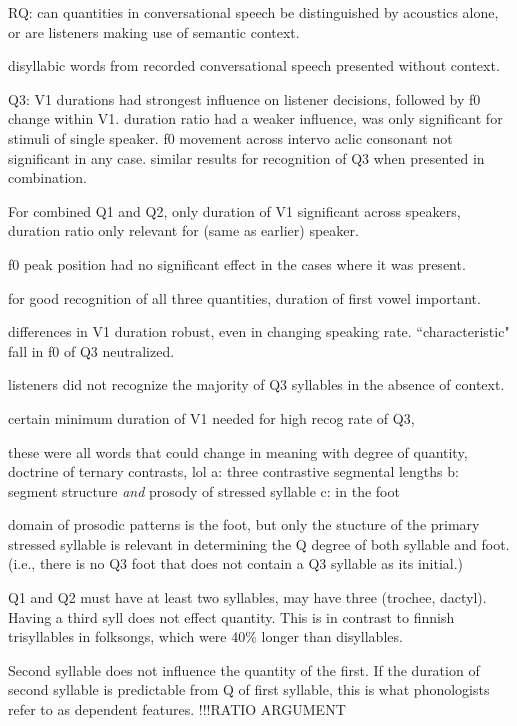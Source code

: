 RQ: can quantities in conversational speech be distinguished by acoustics alone, or are listeners making use of semantic context. 

disyllabic words from recorded conversational speech presented without context. 

Q3: V1 durations had strongest influence on listener decisions, followed by f0 change within V1. duration ratio had a weaker influence, was only significant for stimuli of single speaker. f0 movement across intervo aclic consonant not significant in any case. similar results for recognition of Q3 when presented in combination.

For combined Q1 and Q2, only duration of V1 significant across speakers, duration ratio only relevant for (same as earlier) speaker. 

f0 peak position had no significant effect in the cases where it was present. 

for good recognition of all three quantities, duration of first vowel important. 

differences in V1 duration robust, even in changing speaking rate. ``characteristic" fall in f0 of Q3 neutralized. 

 listeners did not recognize the majority of Q3 syllables in the absence of context. 
 
 certain minimum duration of V1 needed for high recog rate of Q3, 
 
 these were all words that could change in meaning with degree of quantity,
\cite{krullUralica98} 
doctrine of ternary contrasts, lol 
a: three contrastive segmental lengths
b: segment structure {\it and} prosody of stressed syllable
c: in the foot

\par

domain of prosodic patterns is the foot, but only the stucture of the primary stressed syllable is relevant in determining the Q degree of both syllable and foot. (i.e., there is no Q3 foot that does not contain a Q3 syllable as its initial.) 

Q1 and Q2 must have at least two syllables, may have three (trochee, dactyl). Having a third syll does not effect quantity. This is in contrast to finnish trisyllables in folksongs, which were 40\% longer than disyllables. 

Second syllable does not influence the quantity of the first. If the duration of second syllable is predictable from Q of first syllable, this is what phonologists refer to as dependent features. !!!RATIO ARGUMENT

